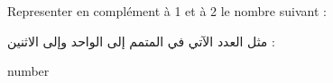 Representer en complément à 1 et à 2 le nombre suivant :

\begin{arab}[utf]
مثل  العدد الآتي في المتمم إلى الواحد وإلى الاثنين  :
\end{arab}

{{  number }}